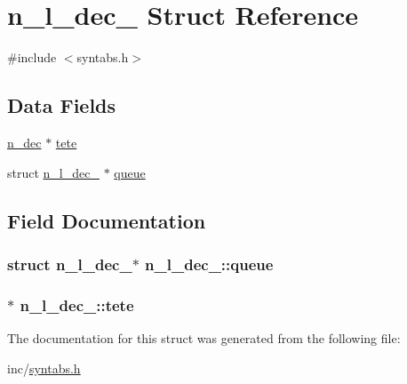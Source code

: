 \hypertarget{structn__l__dec__}{}\section{n\+\_\+l\+\_\+dec\+\_\+ Struct Reference}
\label{structn__l__dec__}


{\ttfamily \#include $<$syntabs.\+h$>$}

\subsection*{Data Fields}
\begin{DoxyCompactItemize}
\item 
\hyperlink{syntabs_8h_a61a9fbd94b7b974b74f0b9839ec4457d}{n\+\_\+dec} $\ast$ \hyperlink{structn__l__dec___a810f1de00c90a0b2acd73562350fa6c4}{tete}
\item 
struct \hyperlink{structn__l__dec__}{n\+\_\+l\+\_\+dec\+\_\+} $\ast$ \hyperlink{structn__l__dec___a16679efba7f2c1474a5eae689b4864f8}{queue}
\end{DoxyCompactItemize}


\subsection{Field Documentation}
\subsubsection[{\texorpdfstring{queue}{queue}}]{\setlength{\rightskip}{0pt plus 5cm}struct {\bf n\+\_\+l\+\_\+dec\+\_\+}$\ast$ n\+\_\+l\+\_\+dec\+\_\+\+::queue}\hypertarget{structn__l__dec___a16679efba7f2c1474a5eae689b4864f8}{}\label{structn__l__dec___a16679efba7f2c1474a5eae689b4864f8}
\subsubsection[{\texorpdfstring{tete}{tete}}]{$\ast$ n\+\_\+l\+\_\+dec\+\_\+\+::tete}\hypertarget{structn__l__dec___a810f1de00c90a0b2acd73562350fa6c4}{}\label{structn__l__dec___a810f1de00c90a0b2acd73562350fa6c4}


The documentation for this struct was generated from the following file\+:\begin{DoxyCompactItemize}
\item 
inc/\hyperlink{syntabs_8h}{syntabs.\+h}\end{DoxyCompactItemize}
